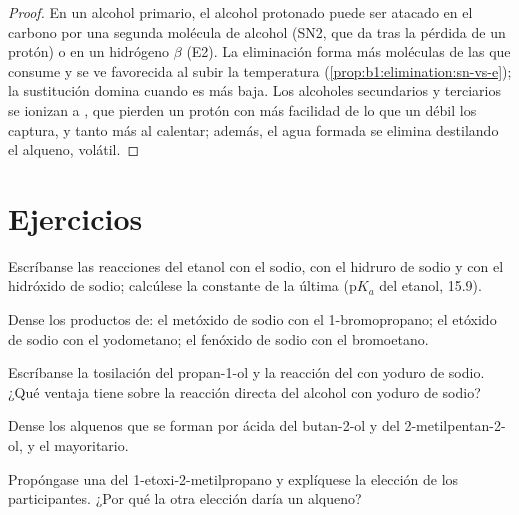 \begin{proof}
En un alcohol primario, el alcohol protonado puede ser atacado en el
carbono por una segunda molécula de alcohol (SN2, que da  tras
la pérdida de un protón) o en un hidrógeno $\beta$ (E2). La eliminación
forma más moléculas de las que consume y se ve favorecida al subir la
temperatura (\cref{prop:b1:elimination:sn-vs-e}); la sustitución domina
cuando es más baja. Los alcoholes secundarios y terciarios se ionizan a
, que pierden un protón con más facilidad de lo que un
 débil los captura, y tanto más al calentar; además, el agua
formada se elimina destilando el alqueno, volátil.
\end{proof}

\section{Ejercicios}

\begin{exercise}[$\star$]\label{exo:b1:alcohol-activation:1}
Escríbanse las reacciones del etanol con el sodio, con el hidruro de
sodio y con el hidróxido de sodio; calcúlese la constante de la última
($\mathrm{p}K_a$ del etanol, 15.9).
\end{exercise}

\begin{exercise}[$\star$]\label{exo:b1:alcohol-activation:2}
Dense los productos de: el metóxido de sodio con el 1-bromopropano; el
etóxido de sodio con el yodometano; el fenóxido de sodio con el
bromoetano.
\end{exercise}

\begin{exercise}[$\star$]\label{exo:b1:alcohol-activation:3}
Escríbanse la tosilación del propan-1-ol y la reacción del  con
yoduro de sodio. ¿Qué ventaja tiene sobre la reacción directa del alcohol
con yoduro de sodio?
\end{exercise}

\begin{exercise}[$\star$]\label{exo:b1:alcohol-activation:4}
Dense los alquenos que se forman por  ácida del butan-2-ol y
del 2-metilpentan-2-ol, y el mayoritario.
\end{exercise}

\begin{exercise}[$\star\star$]\label{exo:b1:alcohol-activation:5}
Propóngase una  del 1-etoxi-2-metilpropano y
explíquese la elección de los participantes. ¿Por qué la otra elección
daría un alqueno?
\end{exercise}

